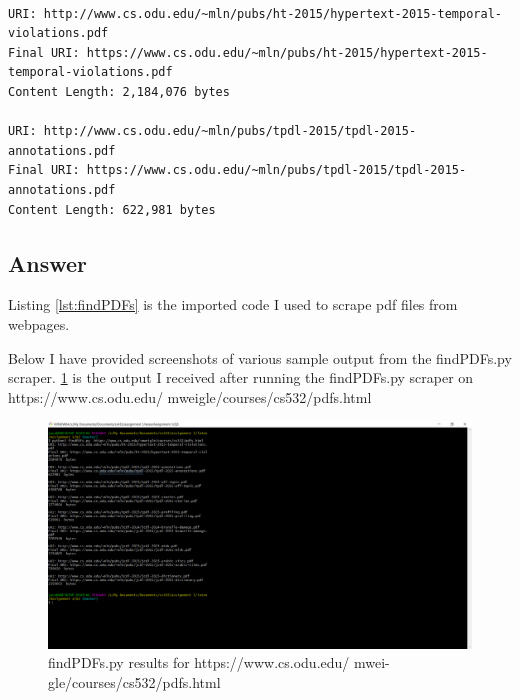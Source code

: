 \documentclass[12pt]{article}
\begin{document}
\begin{lstlisting}[numbers=none, caption=Expected Output, label=lst:q3ExpectedOutput]
% python3 findPDFs.py https://www.cs.odu.edu/~mweigle/courses/cs532/pdfs.html

URI: http://www.cs.odu.edu/~mln/pubs/ht-2015/hypertext-2015-temporal-violations.pdf
Final URI: https://www.cs.odu.edu/~mln/pubs/ht-2015/hypertext-2015-temporal-violations.pdf
Content Length: 2,184,076 bytes

URI: http://www.cs.odu.edu/~mln/pubs/tpdl-2015/tpdl-2015-annotations.pdf
Final URI: https://www.cs.odu.edu/~mln/pubs/tpdl-2015/tpdl-2015-annotations.pdf
Content Length: 622,981 bytes
\end{lstlisting}

\subsection*{Answer}
Listing \ref{lst:findPDFs} is the imported code I used to scrape pdf files from webpages.



Below I have provided screenshots of various sample output from the findPDFs.py scraper. 
\ref{fig:q3ResponseWeigle} is the output I received after running the findPDFs.py scraper on https://www.cs.odu.edu/ mweigle/courses/cs532/pdfs.html 
\begin{figure}[H]
    \centering
    \includegraphics[trim=0 20 10 50, clip, width=\textwidth] {Q3/q3_weiglePdfs.png}
    \caption{findPDFs.py results for https://www.cs.odu.edu/ mwei-
gle/courses/cs532/pdfs.html}
    \label{fig:q3ResponseWeigle}
\end{figure}
\end{document}
